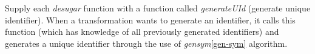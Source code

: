 Supply each \textit{desugar} function with a function called \textit{generateUId} (generate unique identifier). When a transformation wants to generate an identifier, it calls this function (which has knowledge of all previously generated identifiers) and generates a unique identifier through the use of \textit{gensym}\ref{gen-sym} algorithm. 
